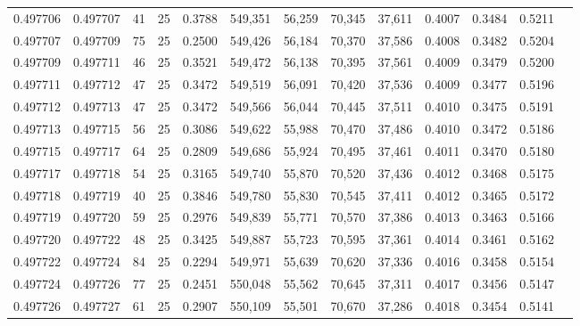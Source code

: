 \begin{tabular}{rrrrrrrrrrrrr}
0.497706 & 0.497707 &    41 &  25 &                                     0.3788 & 549,351 &  56,259 &  70,345 &  37,611 & 0.4007 & 0.3484 & 0.5211 \\
0.497707 & 0.497709 &    75 &  25 &                                     0.2500 & 549,426 &  56,184 &  70,370 &  37,586 & 0.4008 & 0.3482 & 0.5204 \\
0.497709 & 0.497711 &    46 &  25 &                                     0.3521 & 549,472 &  56,138 &  70,395 &  37,561 & 0.4009 & 0.3479 & 0.5200 \\
0.497711 & 0.497712 &    47 &  25 &                                     0.3472 & 549,519 &  56,091 &  70,420 &  37,536 & 0.4009 & 0.3477 & 0.5196 \\
0.497712 & 0.497713 &    47 &  25 &                                     0.3472 & 549,566 &  56,044 &  70,445 &  37,511 & 0.4010 & 0.3475 & 0.5191 \\
0.497713 & 0.497715 &    56 &  25 &                                     0.3086 & 549,622 &  55,988 &  70,470 &  37,486 & 0.4010 & 0.3472 & 0.5186 \\
0.497715 & 0.497717 &    64 &  25 &                                     0.2809 & 549,686 &  55,924 &  70,495 &  37,461 & 0.4011 & 0.3470 & 0.5180 \\
0.497717 & 0.497718 &    54 &  25 &                                     0.3165 & 549,740 &  55,870 &  70,520 &  37,436 & 0.4012 & 0.3468 & 0.5175 \\
0.497718 & 0.497719 &    40 &  25 &                                     0.3846 & 549,780 &  55,830 &  70,545 &  37,411 & 0.4012 & 0.3465 & 0.5172 \\
0.497719 & 0.497720 &    59 &  25 &                                     0.2976 & 549,839 &  55,771 &  70,570 &  37,386 & 0.4013 & 0.3463 & 0.5166 \\
0.497720 & 0.497722 &    48 &  25 &                                     0.3425 & 549,887 &  55,723 &  70,595 &  37,361 & 0.4014 & 0.3461 & 0.5162 \\
0.497722 & 0.497724 &    84 &  25 &                                     0.2294 & 549,971 &  55,639 &  70,620 &  37,336 & 0.4016 & 0.3458 & 0.5154 \\
0.497724 & 0.497726 &    77 &  25 &                                     0.2451 & 550,048 &  55,562 &  70,645 &  37,311 & 0.4017 & 0.3456 & 0.5147 \\
0.497726 & 0.497727 &    61 &  25 &                                     0.2907 & 550,109 &  55,501 &  70,670 &  37,286 & 0.4018 & 0.3454 & 0.5141 \\

\end{tabular}
